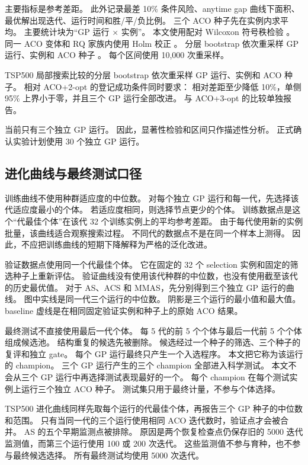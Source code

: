 \documentclass[letterpaper,journal]{IEEEtran}
\begin{document}
主要指标是参考差距。
此外记录最差 10\% 条件风险、anytime gap 曲线下面积、最优解出现迭代、运行时间和胜/平/负比例。
三个 ACO 种子先在实例内求平均。
主要统计块为“GP 运行 \(\times\) 实例”。
本文使用配对 Wilcoxon 符号秩检验 \cite{wilcoxon1945}。
同一 ACO 变体和 RQ 家族内使用 Holm 校正 \cite{holm1979}。
分层 bootstrap 依次重采样 GP 运行、实例和 ACO 种子
\cite{efron1994bootstrap}。
每个区间使用 10,000 次重采样。

TSP500 局部搜索比较的分层 bootstrap 依次重采样 GP 运行、实例和 ACO 种子。
相对 ACO+2-opt 的登记成功条件同时要求：
相对差距至少降低 10\%，单侧 95\% 上界小于零，并且三个 GP 运行全部改进。
与 ACO+3-opt 的比较单独报告。

当前只有三个独立 GP 运行。
因此，显著性检验和区间只作描述性分析。
正式确认实验计划使用 30 个独立 GP 运行。

\subsection{进化曲线与最终测试口径}

训练曲线不使用种群适应度的中位数。
对每个独立 GP 运行和每一代，先选择该代适应度最小的个体。
若适应度相同，则选择节点更少的个体。
训练数据点是这个“代最佳个体”在该代 32 个训练实例上的平均参考差距。
由于每代使用新的实例批量，该曲线适合观察搜索过程。
不同代的数据点不是在同一个样本上测得。
因此，不应把训练曲线的短期下降解释为严格的泛化改进。

验证数据点使用同一个代最佳个体。
它在固定的 32 个 selection 实例和固定的筛选种子上重新评估。
验证曲线没有使用该代种群的中位数，也没有使用截至该代的历史最优值。
对于 AS、ACS 和 MMAS，先分别得到三个独立 GP 运行的曲线。
图中实线是同一代三个运行的中位数。
阴影是三个运行的最小值和最大值。
baseline 虚线是在相同固定验证实例和种子上的原始 ACO 结果。

最终测试不直接使用最后一代个体。
每 5 代的前 5 个个体与最后一代前 5 个个体组成候选池。
结构重复的候选先被删除。
候选经过一个种子的筛选、三个种子的复评和独立 gate。
每个 GP 运行最终只产生一个入选程序。
本文把它称为该运行的 champion。
三个 GP 运行产生的三个 champion 全部进入科学测试。
本文不会从三个 GP 运行中再选择测试表现最好的一个。
每个 champion 在每个测试实例上运行三个独立 ACO 种子。
测试集只用于最终计量，不参与个体选择。

TSP500 进化曲线同样先取每个运行的代最佳个体，再报告三个 GP 种子的中位数和范围。
只有当同一代的三个运行使用相同 ACO 迭代数时，验证点才会被合并。
AS 的五个早期监测点被排除。
原因是两个恢复检查点仍保存旧的 5000 迭代监测值，而第三个运行使用
100 或 200 次迭代。
这些监测值不参与育种，也不参与最终候选选择。
所有最终测试均使用 5000 次迭代。
\end{document}
